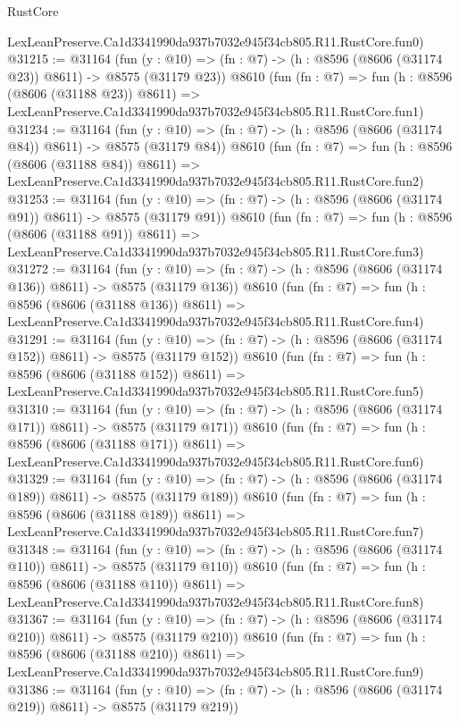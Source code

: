 \begin{lexlean}{RustCore}
\begin{coremodule}
    LexLeanPreserve.Ca1d3341990da937b7032e945f34cb805.R11.RustCore.fun0)
@31215 := @31164
    (fun (y : @10) => (fn : @7) -> (h : @8596 (@8606 (@31174 @23)) @8611) -> @8575 (@31179 @23))
    @8610
    (fun (fn : @7) =>
    fun (h : @8596 (@8606 (@31188 @23)) @8611) =>
    LexLeanPreserve.Ca1d3341990da937b7032e945f34cb805.R11.RustCore.fun1)
@31234 := @31164
    (fun (y : @10) => (fn : @7) -> (h : @8596 (@8606 (@31174 @84)) @8611) -> @8575 (@31179 @84))
    @8610
    (fun (fn : @7) =>
    fun (h : @8596 (@8606 (@31188 @84)) @8611) =>
    LexLeanPreserve.Ca1d3341990da937b7032e945f34cb805.R11.RustCore.fun2)
@31253 := @31164
    (fun (y : @10) => (fn : @7) -> (h : @8596 (@8606 (@31174 @91)) @8611) -> @8575 (@31179 @91))
    @8610
    (fun (fn : @7) =>
    fun (h : @8596 (@8606 (@31188 @91)) @8611) =>
    LexLeanPreserve.Ca1d3341990da937b7032e945f34cb805.R11.RustCore.fun3)
@31272 := @31164
    (fun (y : @10) => (fn : @7) -> (h : @8596 (@8606 (@31174 @136)) @8611) -> @8575 (@31179 @136))
    @8610
    (fun (fn : @7) =>
    fun (h : @8596 (@8606 (@31188 @136)) @8611) =>
    LexLeanPreserve.Ca1d3341990da937b7032e945f34cb805.R11.RustCore.fun4)
@31291 := @31164
    (fun (y : @10) => (fn : @7) -> (h : @8596 (@8606 (@31174 @152)) @8611) -> @8575 (@31179 @152))
    @8610
    (fun (fn : @7) =>
    fun (h : @8596 (@8606 (@31188 @152)) @8611) =>
    LexLeanPreserve.Ca1d3341990da937b7032e945f34cb805.R11.RustCore.fun5)
@31310 := @31164
    (fun (y : @10) => (fn : @7) -> (h : @8596 (@8606 (@31174 @171)) @8611) -> @8575 (@31179 @171))
    @8610
    (fun (fn : @7) =>
    fun (h : @8596 (@8606 (@31188 @171)) @8611) =>
    LexLeanPreserve.Ca1d3341990da937b7032e945f34cb805.R11.RustCore.fun6)
@31329 := @31164
    (fun (y : @10) => (fn : @7) -> (h : @8596 (@8606 (@31174 @189)) @8611) -> @8575 (@31179 @189))
    @8610
    (fun (fn : @7) =>
    fun (h : @8596 (@8606 (@31188 @189)) @8611) =>
    LexLeanPreserve.Ca1d3341990da937b7032e945f34cb805.R11.RustCore.fun7)
@31348 := @31164
    (fun (y : @10) => (fn : @7) -> (h : @8596 (@8606 (@31174 @110)) @8611) -> @8575 (@31179 @110))
    @8610
    (fun (fn : @7) =>
    fun (h : @8596 (@8606 (@31188 @110)) @8611) =>
    LexLeanPreserve.Ca1d3341990da937b7032e945f34cb805.R11.RustCore.fun8)
@31367 := @31164
    (fun (y : @10) => (fn : @7) -> (h : @8596 (@8606 (@31174 @210)) @8611) -> @8575 (@31179 @210))
    @8610
    (fun (fn : @7) =>
    fun (h : @8596 (@8606 (@31188 @210)) @8611) =>
    LexLeanPreserve.Ca1d3341990da937b7032e945f34cb805.R11.RustCore.fun9)
@31386 := @31164
    (fun (y : @10) => (fn : @7) -> (h : @8596 (@8606 (@31174 @219)) @8611) -> @8575 (@31179 @219))

\end{coremodule}
\end{lexlean}
